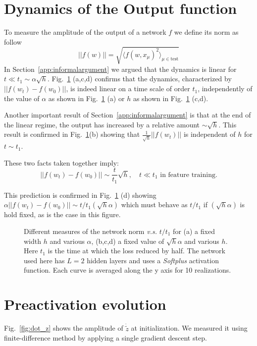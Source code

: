 \documentclass{article}
\newcommand{\be}{\begin{equation}}
\newcommand{\ee}{\end{equation}}
\newcommand{\mr}{\mathrm}
\newcommand{\abs}[1]{|\!|#1|\!|}
\newcommand{\sref}[1]{Section~\ref{#1}}
\newcommand{\fref}[1]{Fig.~\ref{#1}}
\begin{document}
\section{Dynamics of the Output function } \label{app:out}
To measure the amplitude of the output of a network $f$ we define its norm as follow
\be
\abs{ f(w)} = \sqrt{\langle f(w, x_\mu)^2 \rangle_{\mu \in \mr{test}}}
\ee
In \sref{app:informalargument} we argued that  the dynamics is linear for $t\ll t_1\sim \alpha\sqrt{h}$. \fref{fig:dfnorm} (a,c,d) confirms that the dynamics, characterized by $\abs{ f(w_t) - f(w_0) }$, is indeed linear on a time scale of order $t_1$, independently of the value of $\alpha$ as shown in \fref{fig:dfnorm} (a) or $h$ as shown in \fref{fig:dfnorm} (c,d).


Another important result of \sref{app:informalargument} is that at the end of the linear regime, the output has increased by a relative amount $\sim \sqrt{h}$. This result is confirmed in \fref{fig:dfnorm}(b) showing that $\frac{1}{\sqrt{h}}\abs{ f(w_t)}$ is independent of $h$ for $t\sim t_1$.


These two facts taken together imply:
\be
    \abs{ f(w_t) - f(w_0)} \sim \frac{t}{t_1} \sqrt{h}, \quad t\ll t_1 \text{ in feature training.} \label{eq:dfnorm}
\ee

This prediction is confirmed in \fref{fig:dfnorm} (d) showing  $\alpha \abs{ f(w_t) - f(w_0) } \sim t/t_1 (\sqrt{h} \alpha)$ which must behave as $t/t_1$ if  $(\sqrt{h} \alpha)$ is hold fixed, as is the case in this figure.



\begin{figure}[ht]
    \centering
    \caption{Different measures of the network norm {\it v.s.} $t / t_1$ for (a) a fixed width $h$ and various $\alpha$, (b,c,d) a fixed value of $\sqrt{h}\alpha$ and various $h$.
    Here $t_1$ is the time at which the loss reduced by half.
    The network used here has $L=2$ hidden layers and uses a \textit{Softplus} activation function. 
    Each curve is averaged along the y axis for 10 realizations.
    \label{fig:dfnorm}}
\end{figure}



\section{Preactivation evolution} \label{app:dot_z}
\fref{fig:dot_z} shows the amplitude of $\dot{\tilde{z}}$ at initialization.
We measured it using finite-difference method by applying a single gradient descent step.
\end{document}
